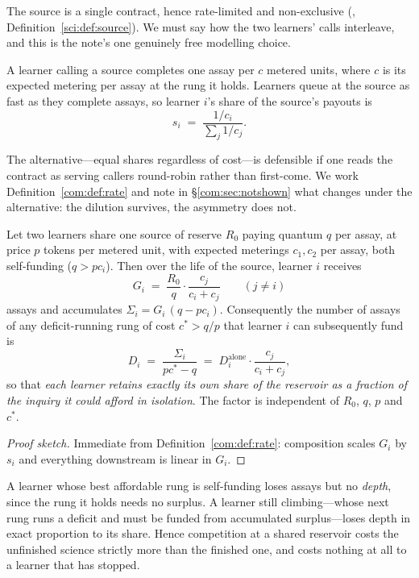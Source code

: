 The source is a single contract, hence rate-limited and non-exclusive (\chSci, Definition~\ref{sci:def:source}).
We must say how the two learners' calls interleave, and this is the note's one genuinely free
modelling choice.

\begin{definition}\label{com:def:rate}
A learner calling a source completes one assay per $c$ metered units, where $c$ is its expected
metering per assay at the rung it holds. Learners queue at the source as fast as they complete
assays, so learner $i$'s share of the source's payouts is
\[
  s_i \;=\; \frac{1/c_i}{\sum_j 1/c_j}.
\]
\end{definition}

The alternative---equal shares regardless of cost---is defensible if one reads the contract as
serving callers round-robin rather than first-come. We work Definition~\ref{com:def:rate} and note in
\S\ref{com:sec:notshown} what changes under the alternative: the dilution survives, the asymmetry
does not.

\begin{proposition}\label{com:prop:dilution}
Let two learners share one source of reserve $R_0$ paying quantum $q$ per assay, at price $p$
tokens per metered unit, with expected meterings $c_1, c_2$ per assay, both self-funding
($q > p c_i$). Then over the life of the source, learner $i$ receives
\[
  G_i \;=\; \frac{R_0}{q}\cdot \frac{c_{j}}{c_i + c_{j}} \qquad (j \neq i)
\]
assays and accumulates $\Sigma_i = G_i\,(q - p c_i)$. Consequently the number of assays of any
deficit-running rung of cost $c^\ast > q/p$ that learner $i$ can subsequently fund is
\[
  D_i \;=\; \frac{\Sigma_i}{p c^\ast - q}
  \;=\; D_i^{\text{alone}} \cdot \frac{c_{j}}{c_i + c_{j}} ,
\]
so that \emph{each learner retains exactly its own share of the reservoir as a fraction of the
inquiry it could afford in isolation}. The factor is independent of $R_0$, $q$, $p$ and $c^\ast$.
\end{proposition}

\begin{proof}[Proof sketch]
Immediate from Definition~\ref{com:def:rate}: composition scales $G_i$ by $s_i$ and everything
downstream is linear in $G_i$.
\end{proof}

\begin{corollary}\label{com:cor:regressive}
A learner whose best affordable rung is self-funding loses assays but no \emph{depth}, since the
rung it holds needs no surplus. A learner still climbing---whose next rung runs a deficit and must
be funded from accumulated surplus---loses depth in exact proportion to its share. Hence
competition at a shared reservoir costs the unfinished science strictly more than the finished
one, and costs nothing at all to a learner that has stopped.
\end{corollary}

